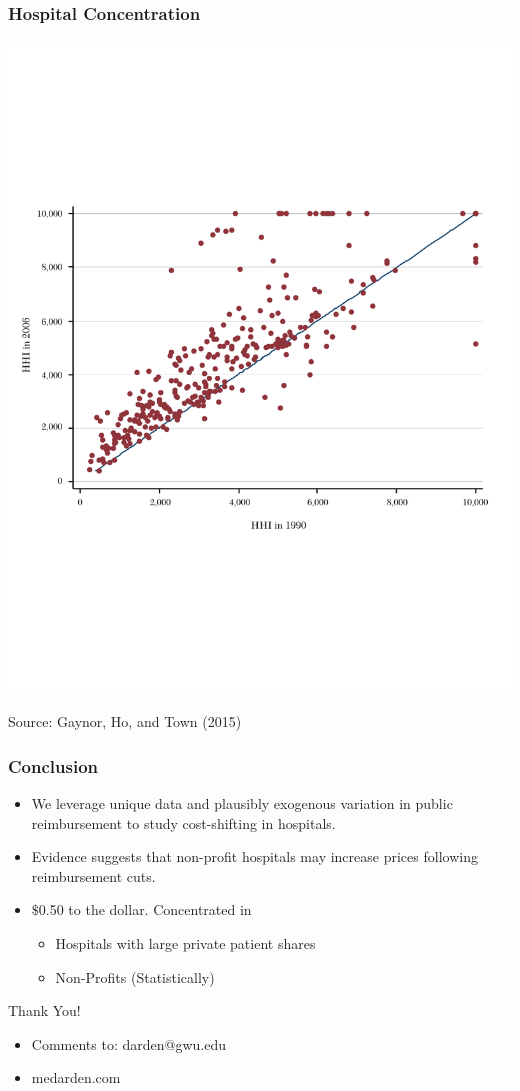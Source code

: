 \documentclass[ucs,9pt]{beamer}
\begin{document}
\begin{frame}
\frametitle{Hospital Concentration}
\begin{center}
\includegraphics[scale=0.5]{gay2}
\end{center}
\tiny Source: Gaynor, Ho, and Town (2015)
\end{frame}



\begin{frame}
\frametitle{Conclusion}
\begin{itemize}
\item We leverage unique data and plausibly exogenous variation in public reimbursement to study cost-shifting in hospitals.
\item Evidence suggests that non-profit hospitals may increase prices following reimbursement cuts.  
\item $\$$0.50 to the dollar.  Concentrated in 
\begin{itemize}
\item Hospitals with large private patient shares
\item Non-Profits (Statistically)
\end{itemize}
\end{itemize}
\end{frame}

\begin{frame}
\huge
Thank You!
\begin{itemize}
\item Comments to: darden@gwu.edu
\item medarden.com
\end{itemize}
\end{frame}
\end{document}
